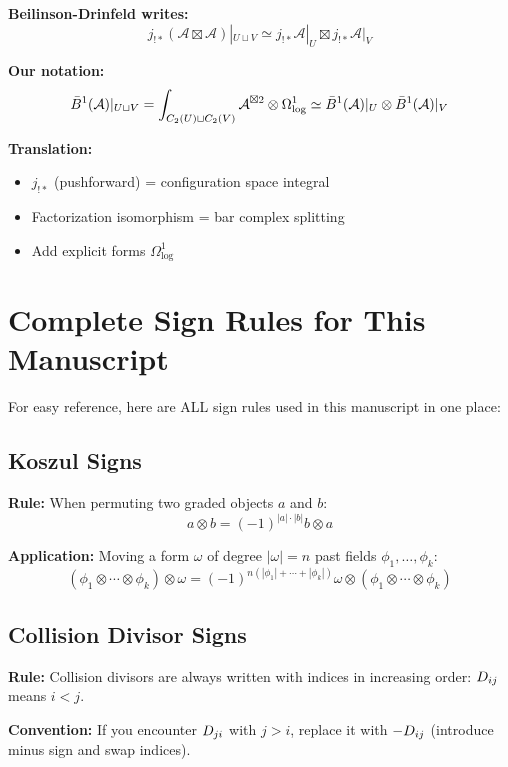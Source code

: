\begin{example}
\textbf{Beilinson-Drinfeld writes:}
$$j_{!*}(\mathcal{A} \boxtimes \mathcal{A})|_{U \sqcup V} \simeq j_{!*}\mathcal{A}|_U \boxtimes j_{!*}\mathcal{A}|_V$$

\textbf{Our notation:}
$$\bar{B}^{1}(\mathcal{A})|_{U \sqcup V} = \int_{C_2(U) \sqcup C_2(V)} \mathcal{A}^{\boxtimes 2} \otimes \Omega^1_{\log} \simeq \bar{B}^{1}(\mathcal{A})|_U \otimes \bar{B}^{1}(\mathcal{A})|_V$$

\textbf{Translation:}
\begin{itemize}
\item $j_{!*}$ (pushforward) = configuration space integral
\item Factorization isomorphism = bar complex splitting
\item Add explicit forms $\Omega^1_{\log}$
\end{itemize}
\end{example}

\section{Complete Sign Rules for This Manuscript}

For easy reference, here are ALL sign rules used in this manuscript in one place:

\subsection{Koszul Signs}

\textbf{Rule:} When permuting two graded objects $a$ and $b$:
$$a \otimes b = (-1)^{|a| \cdot |b|} b \otimes a$$

\textbf{Application:} Moving a form $\omega$ of degree $|\omega| = n$ past fields $\phi_1, \ldots, \phi_k$:
$$(\phi_1 \otimes \cdots \otimes \phi_k) \otimes \omega = (-1)^{n(|\phi_1| + \cdots + |\phi_k|)} \omega \otimes (\phi_1 \otimes \cdots \otimes \phi_k)$$

\subsection{Collision Divisor Signs}

\textbf{Rule:} Collision divisors are always written with indices in increasing order: $D_{ij}$ means $i < j$.

\textbf{Convention:} If you encounter $D_{ji}$ with $j > i$, replace it with $-D_{ij}$ (introduce minus sign and swap indices).

